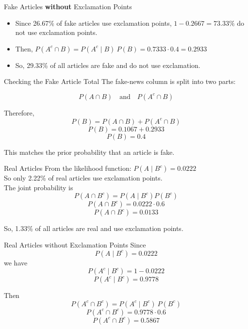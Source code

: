 \documentclass[12pt]{beamer}
\begin{document}
\begin{frame}{}
\begin{block}{Fake Articles \textbf{without} Exclamation Points}
\begin{itemize}
    \item Since 26.67\% of fake articles use exclamation points, $1 - 0.2667 = 73.33\%$ do not use exclamation points.
    \item Then, $P(A^c \cap B) = P(A^c\mid B)~P(B) = 0.7333 \cdot 0.4 = 0.2933$
    \item So, 29.33\% of all articles are fake and do not use exclamation.
\end{itemize}
\end{block}
\end{frame}

\begin{frame}{}
\begin{block}{Checking the Fake Article Total}
The fake-news column is split into two parts:

\[P(A \cap B) \quad \text{and} \quad P(A^c \cap B)\]

Therefore,
\[
P(B)=P(A \cap B)+P(A^c \cap B)
\]
\[
P(B)=0.1067+0.2933
\]
\[
P(B)=0.4
\]

This matches the prior probability that an article is fake.
\end{block}
\end{frame}

\begin{frame}{}
\begin{block}{Real Articles}
From the likelihood function: $P(A\mid B^c)=0.0222$\\

So only 2.22\% of real articles use exclamation points.\\

The joint probability is
\[
P(A \cap B^c)=P(A\mid B^c)P(B^c)
\]
\[
P(A \cap B^c)=0.0222 \cdot 0.6
\]
\[
P(A \cap B^c)=0.0133
\]

So, 1.33\% of all articles are real and use exclamation points.
\end{block}
\end{frame}

\begin{frame}{}
\begin{block}{Real Articles without Exclamation Points}
Since
\[
P(A\mid B^c)=0.0222
\]
we have
\[
P(A^c\mid B^c)=1-0.0222
\]
\[
P(A^c\mid B^c)=0.9778
\]

Then
\[
P(A^c \cap B^c)=P(A^c\mid B^c) ~ P(B^c)
\]
\[
P(A^c \cap B^c)=0.9778 \cdot 0.6
\]
\[
P(A^c \cap B^c)=0.5867
\]
\end{block}
\end{frame}
\end{document}
